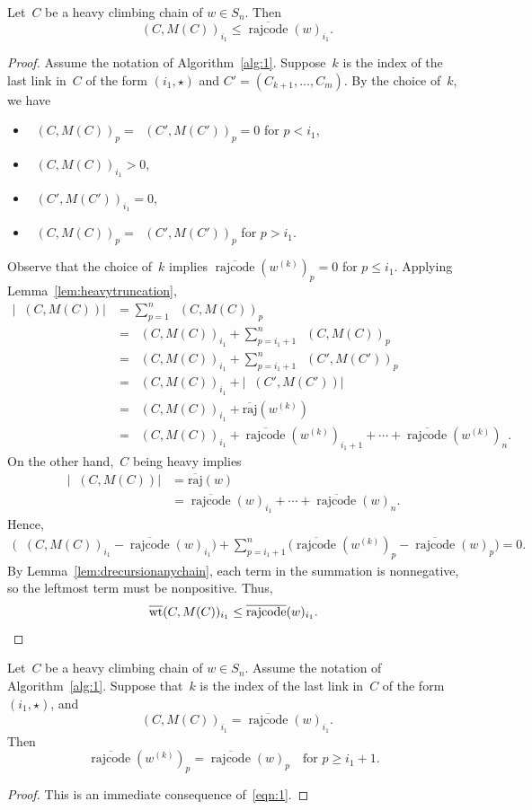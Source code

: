 \documentclass[ALCO]{cedram}
\newcommand{\absoverrajcode}[1]{\overline{\mathrm{raj}}(#1)}
\DeclareMathOperator{\dwt}{\overline{\mathrm{wt}}}
\DeclareMathOperator{\rr}{\mathrm{rajcode}}
\newcommand{\orr}{\overline{\rr}}
\begin{document}
\begin{lemma}
	\label{lem:heavymaxfirstmarks}
	Let~$C$ be a heavy climbing chain of $w\in S_n$. Then
	\[\dwt(C,M(C))_{i_1}\leq \orr(w)_{i_1}. \]
\end{lemma}
\begin{proof}
	Assume the notation of Algorithm~\ref{alg:1}. Suppose~$k$ is the index of the last link in~$C$ of the form $(i_1,\star)$ and $C'=(C_{k+1},\ldots,C_m)$.
	By the choice of~$k$, we have
	\begin{itemize}
		\item $\dwt(C,M(C))_p=\dwt(C',M(C'))_p=0$ for $p<i_1$,
		\item $\dwt(C,M(C))_{i_1} >0$,
		\item $\dwt(C',M(C'))_{i_1} =0$,
		\item $\dwt(C,M(C))_p=\dwt(C',M(C'))_p$ for $p>i_1$.
	\end{itemize}
	Observe that the choice of~$k$ implies $\orr(w^{(k)})_{p}=0$ for $p\leq i_1$. Applying Lemma~\ref{lem:heavytruncation},
	\begin{align*}
		\left|\dwt(C,M(C))\right| &= \sum_{p=1}^{n}\dwt(C,M(C))_p \\
		&= \dwt(C,M(C))_{i_1} + \sum_{p=i_1+1}^{n}\dwt(C,M(C))_{p} \\
		&= \dwt(C,M(C))_{i_1} + \sum_{p=i_1+1}^{n}\dwt(C',M(C'))_{p} \\
		&= \dwt(C,M(C))_{i_1} + \left|\dwt(C',M(C'))\right| \\
		&= \dwt(C,M(C))_{i_1} +\absoverrajcode{w^{(k)}} \\
		&= \dwt(C,M(C))_{i_1} +\orr(w^{(k)})_{i_1+1}+\cdots +\orr(w^{(k)})_n.
	\end{align*}
	On the other hand,~$C$ being heavy implies
	\begin{align*}
		\left|\dwt(C,M(C))\right| &= \absoverrajcode{w}\\
		&= \orr(w)_{i_1}+\cdots+\orr(w)_n.
	\end{align*}
	Hence,
	\begin{align}
		\label{eqn:1}
		\biggr(\dwt(C,M(C))_{i_1}-\orr(w)_{i_1}\biggr)+\sum_{p=i_1+1}^{n} \biggr(\orr(w^{(k)})_{p} -\orr(w)_{p}\biggr)=0.
	\end{align}
	By Lemma~\ref{lem:drecursionanychain}, each term in the summation is nonnegative, so the leftmost term must be nonpositive. Thus,
	\[\dwt(C,M(C))_{i_1}\leq \orr(w)_{i_1}.\qedhere \] 
\end{proof}

\begin{lemma}
	\label{lem:heavyequalitycase}
	Let~$C$ be a heavy climbing chain of $w\in S_n$. Assume the notation of Algorithm~\ref{alg:1}. 
	Suppose that~$k$ is the index of the last link in~$C$ of the form $(i_1,\star)$, and
	\[\dwt(C,M(C))_{i_1}= \orr(w)_{i_1}. \]
	Then
	\[
	\orr(w^{(k)})_p = \orr(w)_p \quad\mbox{for } p\geq i_1+1. 
	\]
\end{lemma}
\begin{proof}
	This is an immediate consequence of~\eqref{eqn:1}.
\end{proof}
\end{document}
